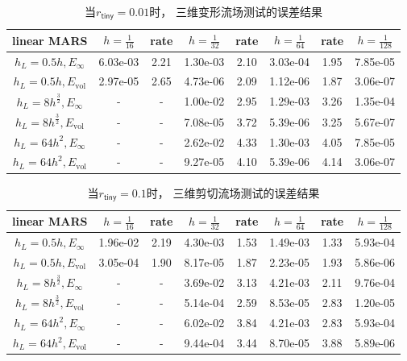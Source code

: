 \begin{table}[htbp]
	\label{tab3}
	\centering
	\caption[$r_{\mathsf{tiny}}=0.01$时，三维剪切流场测试的误差结果]{当$r_{\mathsf{tiny}}=0.01$时，
		三维变形流场测试的误差结果}
	\begin{tabular}{c|ccccccc}
		\hline \hline
		linear MARS
		&$h=\frac{1}{16}$ & rate & $h=\frac{1}{32}$ 
		& rate & $h=\frac{1}{64}$ & rate &  $h=\frac{1}{128}$
		\\ \hline 
		$h_L=0.5h,E_{\infty}$ & 6.03e-03 & 2.21 & 1.30e-03 & 2.10 &3.03e-04 & 1.95 & 7.85e-05
		\\
		$h_L=0.5h,E_{\mathrm{vol}}$  & 2.97e-05 & 2.65 & 4.73e-06 & 2.09 &1.12e-06 & 1.87 & 3.06e-07
		\\ \hline 
		$h_L=8h^{\frac{3}{2}},E_{\infty}$ & - & - & 1.00e-02 & 2.95 &1.29e-03 & 3.26 & 1.35e-04
		\\
		$h_L=8h^{\frac{3}{2}},E_{\mathrm{vol}}$  & - & - & 7.08e-05 & 3.72 &5.39e-06 & 3.25 & 5.67e-07
		\\ \hline 
		$h_L=64h^2,E_{\infty}$ & - & - & 2.62e-02 & 4.33 &1.30e-03 & 4.05 & 7.85e-05
		\\
		$h_L=64h^2,E_{\mathrm{vol}}$  & - & - & 9.27e-05 & 4.10 &5.39e-06 & 4.14 & 3.06e-07
		\\ \hline \hline
	\end{tabular}
\end{table}  

\begin{table}[htbp]
	\label{tab4}
	\centering
		\caption[$r_{\mathsf{tiny}}=0.1$时，三维剪切流场测试的误差结果]{当$r_{\mathsf{tiny}}=0.1$时，
			三维剪切流场测试的误差结果}
	\begin{tabular}{c|ccccccc}
		\hline \hline
		linear MARS
		&$h=\frac{1}{16}$ & rate & $h=\frac{1}{32}$ 
		& rate & $h=\frac{1}{64}$ & rate &  $h=\frac{1}{128}$
		\\ \hline 
		$h_L=0.5h,E_{\infty}$ & 1.96e-02 & 2.19 & 4.30e-03 &1.53&1.49e-03& 1.33 & 5.93e-04
		\\
		$h_L=0.5h,E_{\mathrm{vol}}$  & 3.05e-04 & 1.90 & 8.17e-05 & 1.87 &2.23e-05 & 1.93 & 5.86e-06
		\\ \hline 
		$h_L=8h^{\frac{3}{2}},E_{\infty}$ & - & - & 3.69e-02 & 3.13 &4.21e-03 & 2.11 & 9.76e-04
		\\
		$h_L=8h^{\frac{3}{2}},E_{\mathrm{vol}}$  & - & - & 5.14e-04 & 2.59&8.53e-05 & 2.83 & 1.20e-05
		\\ \hline 
		$h_L=64h^2,E_{\infty}$ & - & - & 6.02e-02 & 3.84 &4.21e-03 & 2.83 & 5.93e-04
		\\
		$h_L=64h^2,E_{\mathrm{vol}}$  & - & - & 9.44e-04 & 3.44 &8.70e-05 & 3.88 & 5.89e-06
		\\ \hline \hline
	\end{tabular}
\end{table}  

